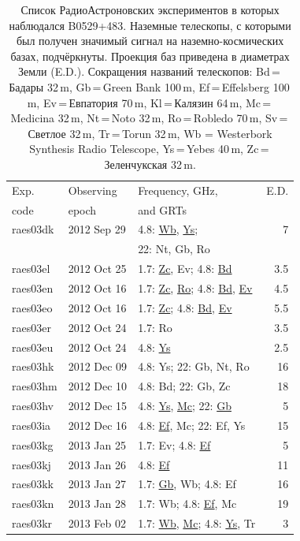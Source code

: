 \begin{table}
\caption{Список РадиоАстроновских экспериментов в которых наблюдался B0529+483. Наземные телескопы,
с которыми был получен значимый сигнал на наземно-космических базах, подчёркнуты. Проекция баз
приведена в диаметрах Земли (E.D.). Сокращения названий телескопов: Bd\,=\,Бадары 32\,m,
Gb\,=\,Green Bank 100\,m, Ef\,=\,Effelsberg 100\,m, Ev\,=\,Евпатория 70\,m, Kl\,=\,Калязин 64\,m,
Mc\,=\,Medicina 32\,m, Nt\,=\,Noto 32\,m, Ro\,=\,Robledo 70\,m, Sv\,=\,Светлое 32\,m, Tr\,=\,Torun
32\,m, Wb = Westerbork Synthesis Radio Telescope, Ys\,=\,Yebes 40\,m, Zc\,=\,Зеленчукская 32\,m.}
\label{tab:0529_exper}
\centering
\small
\begin{SingleSpace}
\begin{tabular}{lllr}
\toprule
Exp.     & Observing   & Frequency, GHz, & E.D. \\
code     & epoch       & and GRTs        & \\
\midrule
raes03dk & 2012 Sep 29 & 4.8: \underline{Wb}, \underline{Ys}; & 7 \\
         &            &  22: Nt, Gb, Ro\\
raes03el & 2012 Oct 25 & 1.7: \underline{Zc}, Ev; 4.8: \underline{Bd} & 3.5 \\
raes03en & 2012 Oct 16 & 1.7: \underline{Zc}, \underline{Ro}; 4.8: \underline{Bd}, \underline{Ev} &
4.5 \\
raes03eo & 2012 Oct 16 & 1.7: \underline{Zc}; 4.8: \underline{Bd}, \underline{Ev} & 5.5 \\
raes03er & 2012 Oct 24 & 1.7: Ro & 3.5 \\
raes03eu & 2012 Oct 24 & 4.8: \underline{Ys} & 2.5 \\
raes03hk & 2012 Dec 09 & 4.8: Ys; 22: Gb, Nt, Ro & 16 \\
raes03hm & 2012 Dec 10 & 4.8: Bd; 22: Gb, Zc & 18 \\
raes03hv & 2012 Dec 15 & 4.8: \underline{Ys}, \underline{Mc}; 22: \underline{Gb} & 5 \\
raes03ia & 2012 Dec 16 & 4.8: \underline{Ef}, Mc; 22: Ef, Ys & 15 \\
raes03kg & 2013 Jan 25 & 1.7: Ev; 4.8: \underline{Ef} & 5 \\
raes03kj & 2013 Jan 26 & 4.8: \underline{Ef} & 11 \\
raes03kk & 2013 Jan 27 & 1.7: \underline{Gb}, Wb; 4.8: Ef & 16 \\
raes03kn & 2013 Jan 28 & 1.7: Wb; 4.8: \underline{Ef}, Mc & 19 \\
raes03kr & 2013 Feb 02 & 1.7: \underline{Wb}, \underline{Mc}; 4.8: \underline{Ys}, Tr & 3 \\

\end{tabular}
\end{SingleSpace}
\end{table}
